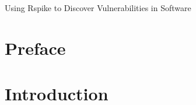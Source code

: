 \documentclass[11pt]{article}
\begin{document}
\begin{titlepage}
\vspace*{1.5in}
	\begin{center}
	\LARGE{Using Rspike to Discover Vulnerabilities in Software}
	\\
	\vspace*{1in}
	\end{center}
\end{titlepage}

\tableofcontents
\newpage

\section{Preface}

\section{Introduction}
\end{document}
